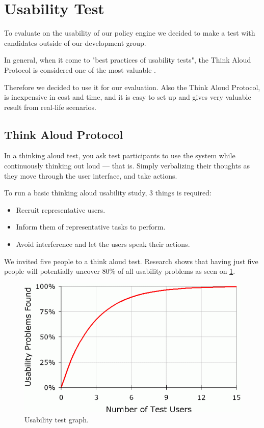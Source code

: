 \section{Usability Test}
\label{sec:usability-test}
To evaluate on the usability of our policy engine we decided to make a test with candidates outside of our development group.

In general, when it come to "best practices of usability tests", the Think Aloud Protocol is considered one of the most valuable \cite{Nielsen1993}.

Therefore we decided to use it for our evaluation. Also the Think Aloud Protocol, is inexpensive in cost and time, and it is easy to set up and gives very valuable result from real-life scenarios. 

\subsection{Think Aloud Protocol}
In a thinking aloud test, you ask test participants to use the system while continuously thinking out loud — that is. Simply verbalizing their thoughts as they move through the user interface, and take actions.

To run a basic thinking aloud usability study, 3 things is required:
\begin{itemize}
\item Recruit representative users.
\item Inform them of representative tasks to perform. %
\item Avoid interference and let the users speak their actions.
\end{itemize}

We invited five people to a think aloud test. Research shows that having just five people will potentially uncover 80\% of all usability problems \cite{jakobnielsen2000fiveusers} as seen on \ref{fig:usabilitycurve}.

\begin{figure}[ht]
\centering
\includegraphics[width=\columnwidth]{usabilitycurve.png}
\caption{Usability test graph.}
\label{fig:usabilitycurve}
\end{figure}

